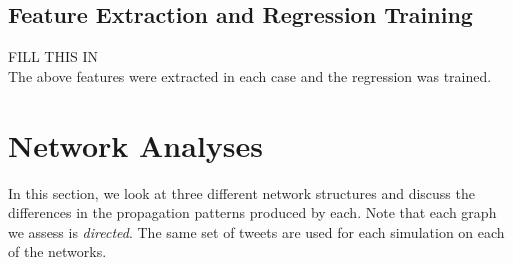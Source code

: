 \subsection{Feature Extraction and Regression Training}
FILL THIS IN
\\
The above features were extracted in each case and the regression was trained.


\section{Network Analyses}
In this section, we look at three different network structures and discuss the differences in the propagation patterns produced by each. Note that each graph we assess is \textit{directed}. The same set of tweets are used for each simulation on each of the networks.

